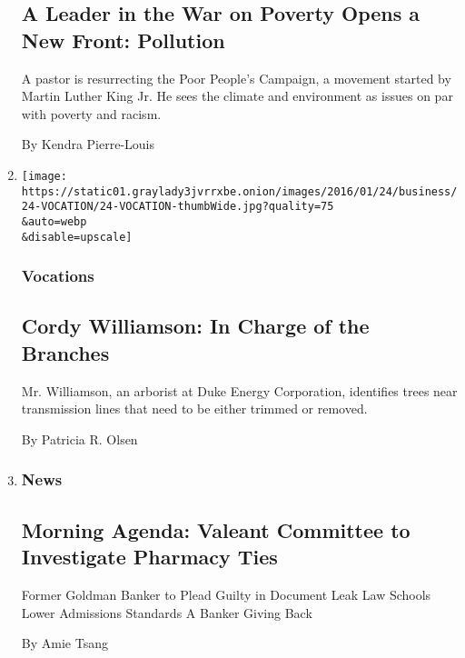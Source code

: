 \begin{enumerate}
{  \subsection{A Leader in the War on Poverty Opens a New Front:
  Pollution}\label{a-leader-in-the-war-on-poverty-opens-a-new-front-pollution}}

  A pastor is resurrecting the Poor People's Campaign, a movement
  started by Martin Luther King Jr. He sees the climate and environment
  as issues on par with poverty and racism.

  By Kendra Pierre-Louis
\item
  \href{/2016/01/24/jobs/cordy-williamson-in-charge-of-the-branches.html}{}

  \texttt{[image: https://static01.graylady3jvrrxbe.onion/images/2016/01/24/business/24-VOCATION/24-VOCATION-thumbWide.jpg?quality=75\\\&auto=webp\\\&disable=upscale]}

  \hypertarget{vocations}{%
  \subsubsection{Vocations}\label{vocations}}

  \hypertarget{cordy-williamson-in-charge-of-the-branches}{%
  \subsection{Cordy Williamson: In Charge of the
  Branches}\label{cordy-williamson-in-charge-of-the-branches}}

  Mr. Williamson, an arborist at Duke Energy Corporation, identifies
  trees near transmission lines that need to be either trimmed or
  removed.

  By Patricia R. Olsen
\item
  \href{https://news.blogs.nytimes3xbfgragh.onion/2015/10/27/morning-agenda-valeant-committee-to-investigate-pharmacy-ties/}{}

  \hypertarget{news}{%
  \subsubsection{News}\label{news}}

  \hypertarget{morning-agenda-valeant-committee-to-investigate-pharmacy-ties}{%
  \subsection{Morning Agenda: Valeant Committee to Investigate Pharmacy
  Ties}\label{morning-agenda-valeant-committee-to-investigate-pharmacy-ties}}

  Former Goldman Banker to Plead Guilty in Document Leak \textbar{} Law
  Schools Lower Admissions Standards \textbar{} A Banker Giving Back

  By Amie Tsang
\end{enumerate}

